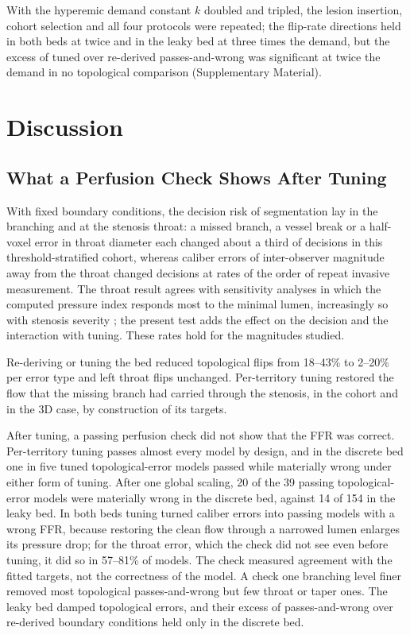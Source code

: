 \documentclass[journal,twoside,web]{ieeecolor}
\begin{document}
With the hyperemic demand constant $k$ doubled and tripled, the lesion insertion, cohort selection and all four protocols were repeated; the
flip-rate directions held in both beds at twice and in the leaky bed at three times the demand, but the excess of
tuned over re-derived passes-and-wrong was significant at twice the demand in no topological comparison
(Supplementary Material).

\section{Discussion}
\subsection{What a Perfusion Check Shows After Tuning}
With fixed boundary conditions, the decision risk of segmentation lay in the branching and at the stenosis throat:
a missed branch, a vessel break or a half-voxel error in throat diameter each changed about a third of decisions in
this threshold-stratified cohort, whereas caliber errors of inter-observer magnitude away from the throat changed
decisions at rates of the order of repeat invasive measurement. The throat result agrees with sensitivity analyses
in which the computed pressure index responds most to the minimal lumen, increasingly so with stenosis severity
\cite{sankaran2015tmi,fernandez2024}; the present test adds the effect on the decision and the interaction with
tuning. These rates hold for the magnitudes studied.

Re-deriving or tuning the bed reduced topological flips from 18--43\% to 2--20\% per error type and left throat
flips unchanged. Per-territory
tuning restored the flow that the missing branch had carried through the stenosis, in the cohort and in the 3D case, by construction of its targets.

After tuning, a passing perfusion check did not show that the FFR was correct. Per-territory tuning passes
almost every model by design, and in the discrete bed one in five tuned topological-error models passed while
materially wrong under either form of tuning. After one global scaling, 20 of the 39 passing topological-error models were materially wrong in the discrete bed, against 14 of 154 in the leaky bed. In both beds tuning turned
caliber errors into passing models with a wrong FFR, because restoring the clean flow through a narrowed lumen enlarges
its pressure drop; for the throat error, which the check did not see even before tuning, it did so in 57--81\% of models. The check measured agreement with the fitted targets, not the correctness of the model. A check one
branching level finer removed most topological passes-and-wrong but few throat or taper ones. The leaky
bed damped topological errors, and their excess of passes-and-wrong over re-derived boundary conditions held only in
the discrete bed.
\end{document}
